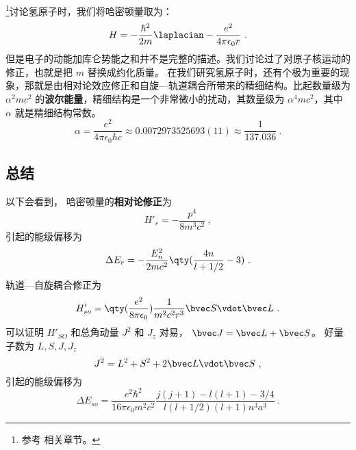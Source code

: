 

\begin{issues}
\issueDraft
\end{issues}

\footnote{参考 \cite{GriffQ} 相关章节。}讨论氢原子时，我们将哈密顿量取为：\begin{equation}
H=-\frac{\hbar^2}{2m}\laplacian-\frac{e^2}{4\pi\epsilon_0 r}~.
\end{equation}
但是电子的动能加库仑势能之和并不是完整的描述。我们讨论过了对原子核运动的修正，也就是把 $m$ 替换成约化质量。%
在我们研究氢原子时，还有个极为重要的现象，那就是由相对论效应修正和自旋—轨道耦合所带来的精细结构。比起数量级为 $\alpha^2 mc^2$ 的\textbf{波尔能量}，精细结构是一个非常微小的扰动，其数量级为 $\alpha^4 mc^2$，其中 $\alpha$ 就是精细结构常数。
\begin{equation}
\alpha = \frac{e^2}{4\pi\epsilon_0\hbar c} \approx 0.0072973525693(11) \approx \frac{1}{137.036}~.
\end{equation}

\subsection{总结}
以下会看到， 哈密顿量的\textbf{相对论修正}为
\begin{equation}\label{eq_HfineS_2}
H'_r = -\frac{p^4}{8m^3 c^2}~,
\end{equation}
引起的能级偏移为
\begin{equation}
\Delta E_r = -\frac{E_n^2}{2mc^2} \qty(\frac{4n}{l+1/2}-3)~.
\end{equation}
轨道—自旋耦合修正为
\begin{equation}\label{eq_HfineS_3}
H'_{so} = \qty(\frac{e^2}{8\pi\epsilon_0}) \frac{1}{m^2c^2 r^3} \bvec S \vdot \bvec L~.
\end{equation}
可以证明 $H'_{SO}$ 和总角动量 $J^2$ 和 $J_z$ 对易， $\bvec J = \bvec L + \bvec S$。 好量子数为 $L, S, J, J_z$
\begin{equation}
J^2 = L^2 + S^2 + 2\bvec L \vdot \bvec S~,
\end{equation}
引起的能级偏移为
\begin{equation}
\Delta E_{so} = \frac{e^2\hbar^2}{16\pi\epsilon_0 m^2 c^2} \frac{j(j+1) - l(l+1) - 3/4}{l(l+1/2)(l+1)n^3 a^3}~.
\end{equation}

